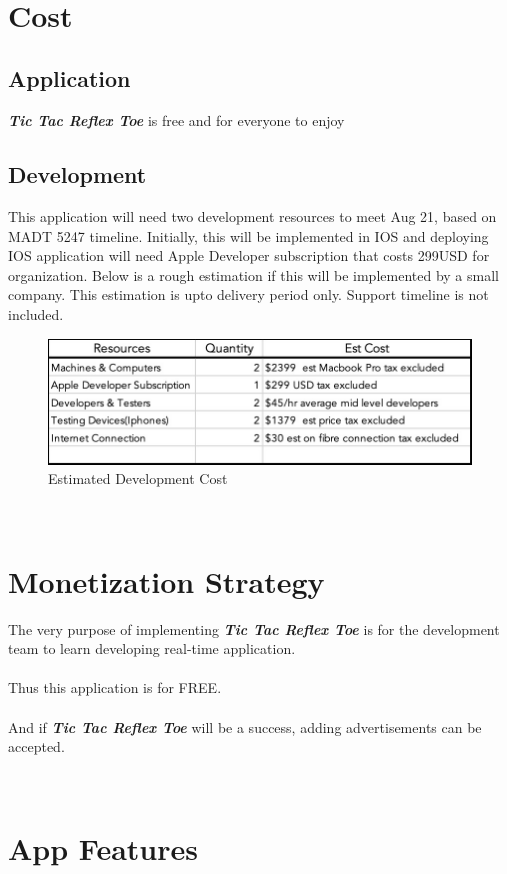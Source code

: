 \documentclass{article}
\begin{document}
~\newpage
\section{Cost}
    \subsection{Application}
        \textbf{\emph{Tic Tac Reflex Toe}} is free and for everyone to enjoy
    \subsection{Development} 
        This application will need two development resources to meet Aug 21, based on MADT 5247 timeline.  Initially, this will be implemented in IOS and deploying IOS application will need Apple Developer subscription that costs 299USD for organization.  Below is a rough estimation if this will be implemented by a small company. This estimation is upto delivery period only.  Support timeline is not included.
        \begin{figure}[h]
        \centering
        \includegraphics[width=5in]{images/Cost.jpg}
        \caption{Estimated Development Cost}
        \end{figure}
~\newline
\section{Monetization Strategy}
The very purpose of implementing \textbf{\emph{Tic Tac Reflex Toe}} is for the development team to learn developing real-time application.\\\\Thus this application is for FREE.\\\\And if \textbf{\emph{Tic Tac Reflex Toe}} will be a success, adding advertisements can be accepted.

~\newpage
\section{App Features}
\end{document}
